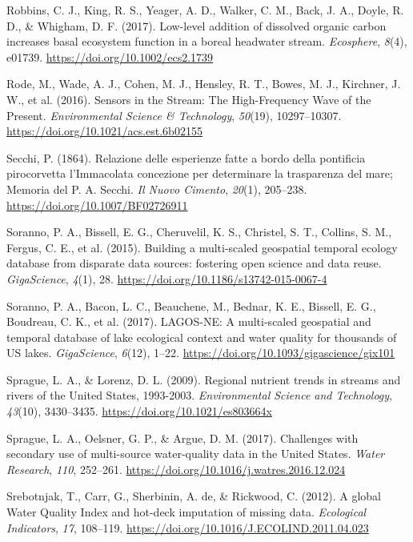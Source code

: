 \documentclass[]{article}
\begin{document}
\leavevmode\hypertarget{ref-Robbins2017}{}%
Robbins, C. J., King, R. S., Yeager, A. D., Walker, C. M., Back, J. A.,
Doyle, R. D., \& Whigham, D. F. (2017). Low-level addition of dissolved
organic carbon increases basal ecosystem function in a boreal headwater
stream. \emph{Ecosphere}, \emph{8}(4), e01739.
\url{https://doi.org/10.1002/ecs2.1739}

\leavevmode\hypertarget{ref-Rode2016}{}%
Rode, M., Wade, A. J., Cohen, M. J., Hensley, R. T., Bowes, M. J.,
Kirchner, J. W., et al. (2016). Sensors in the Stream: The
High-Frequency Wave of the Present. \emph{Environmental Science \&
Technology}, \emph{50}(19), 10297--10307.
\url{https://doi.org/10.1021/acs.est.6b02155}

\leavevmode\hypertarget{ref-Secchi1864}{}%
Secchi, P. (1864). Relazione delle esperienze fatte a bordo della
pontificia pirocorvetta l'Immacolata concezione per determinare la
trasparenza del mare; Memoria del P. A. Secchi. \emph{Il Nuovo Cimento},
\emph{20}(1), 205--238. \url{https://doi.org/10.1007/BF02726911}

\leavevmode\hypertarget{ref-Soranno2015}{}%
Soranno, P. A., Bissell, E. G., Cheruvelil, K. S., Christel, S. T.,
Collins, S. M., Fergus, C. E., et al. (2015). Building a multi-scaled
geospatial temporal ecology database from disparate data sources:
fostering open science and data reuse. \emph{GigaScience}, \emph{4}(1),
28. \url{https://doi.org/10.1186/s13742-015-0067-4}

\leavevmode\hypertarget{ref-Soranno2017}{}%
Soranno, P. A., Bacon, L. C., Beauchene, M., Bednar, K. E., Bissell, E.
G., Boudreau, C. K., et al. (2017). LAGOS-NE: A multi-scaled geospatial
and temporal database of lake ecological context and water quality for
thousands of US lakes. \emph{GigaScience}, \emph{6}(12), 1--22.
\url{https://doi.org/10.1093/gigascience/gix101}

\leavevmode\hypertarget{ref-Sprague2009}{}%
Sprague, L. A., \& Lorenz, D. L. (2009). Regional nutrient trends in
streams and rivers of the United States, 1993-2003. \emph{Environmental
Science and Technology}, \emph{43}(10), 3430--3435.
\url{https://doi.org/10.1021/es803664x}

\leavevmode\hypertarget{ref-Sprague2017}{}%
Sprague, L. A., Oelsner, G. P., \& Argue, D. M. (2017). Challenges with
secondary use of multi-source water-quality data in the United States.
\emph{Water Research}, \emph{110}, 252--261.
\url{https://doi.org/10.1016/j.watres.2016.12.024}

\leavevmode\hypertarget{ref-Srebotnjak2012}{}%
Srebotnjak, T., Carr, G., Sherbinin, A. de, \& Rickwood, C. (2012). A
global Water Quality Index and hot-deck imputation of missing data.
\emph{Ecological Indicators}, \emph{17}, 108--119.
\url{https://doi.org/10.1016/J.ECOLIND.2011.04.023}
\end{document}
